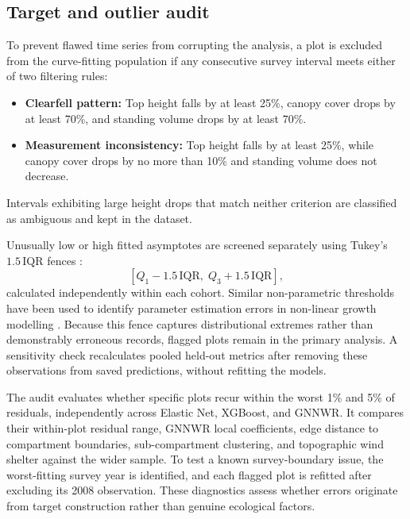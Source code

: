 \documentclass[logo,msc,ai]{infthesis}           %
\begin{document}
\subsection*{Target and outlier audit}
To prevent flawed time series from corrupting the analysis, a plot is excluded from the curve-fitting population if any consecutive survey interval meets either of two filtering rules:
\begin{itemize}
\setlength\itemsep{2pt}
\item \textbf{Clearfell pattern:} Top height falls by at least 25\%, canopy cover drops by at least 70\%, and standing volume drops by at least 70\%.
\item \textbf{Measurement inconsistency:} Top height falls by at least 25\%, while canopy cover drops by no more than 10\% and standing volume does not decrease.
\end{itemize}
Intervals exhibiting large height drops that match neither criterion are classified as ambiguous and kept in the dataset.

Unusually low or high fitted asymptotes are screened separately using Tukey's $1.5\,\mathrm{IQR}$ fences \cite{tukey1977Exploratory}:
\begin{equation}
\left[Q_1 - 1.5\,\mathrm{IQR},\; Q_3 + 1.5\,\mathrm{IQR}\right],
\label{eq:tukey-fences}
\end{equation}
calculated independently within each cohort. Similar non-parametric thresholds have been used to identify parameter estimation errors in non-linear growth modelling \cite{markovic2014NewApproach}. Because this fence captures distributional extremes rather than demonstrably erroneous records, flagged plots remain in the primary analysis. A sensitivity check recalculates pooled held-out metrics after removing these observations from saved predictions, without refitting the models.

The audit evaluates whether specific plots recur within the worst 1\% and 5\% of residuals, independently across Elastic Net, XGBoost, and GNNWR. It compares their within-plot residual range, GNNWR local coefficients, edge distance to compartment boundaries, sub-compartment clustering, and topographic wind shelter against the wider sample. To test a known survey-boundary issue, the worst-fitting survey year is identified, and each flagged plot is refitted after excluding its 2008 observation. These diagnostics assess whether errors originate from target construction rather than genuine ecological factors.

\end{document}
